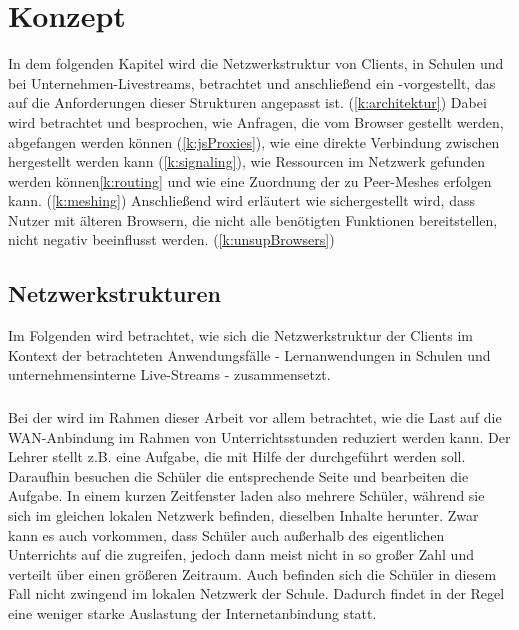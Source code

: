 \chapter{Konzept}\label{ch:concept}
%
In dem folgenden Kapitel wird die Netzwerkstruktur von Clients, in Schulen und bei Unternehmen-Livestreams, betrachtet und anschließend ein \pTp-\cdn vorgestellt, das auf die Anforderungen dieser Strukturen angepasst ist. (\ref{k:architektur}) Dabei wird betrachtet und besprochen, wie Anfragen, die vom Browser gestellt werden, abgefangen werden können (\ref{k:jsProxies}), wie eine direkte Verbindung zwischen \clients hergestellt werden kann (\ref{k:signaling}), wie Ressourcen im Netzwerk gefunden werden können\ref{k:routing} und wie eine Zuordnung der \clients zu Peer-Meshes erfolgen kann. (\ref{k:meshing}) Anschließend wird erläutert wie sichergestellt wird, dass Nutzer mit älteren Browsern, die nicht alle benötigten Funktionen bereitstellen, nicht negativ beeinflusst werden. (\ref{k:unsupBrowsers})


\section{Netzwerkstrukturen}
Im Folgenden wird betrachtet, wie sich die Netzwerkstruktur der Clients im Kontext der betrachteten Anwendungsfälle - Lernanwendungen in Schulen und unternehmensinterne Live-Streams - zusammensetzt.
\subsection{\schulCloud}
Bei der \schulCloud wird im Rahmen dieser Arbeit vor allem betrachtet, wie die Last auf die WAN-Anbindung im Rahmen von Unterrichtsstunden reduziert werden kann. Der Lehrer stellt z.B. eine Aufgabe, die mit Hilfe der \schulCloud durchgeführt werden soll. Daraufhin besuchen die Schüler die entsprechende Seite und bearbeiten die Aufgabe. In einem kurzen Zeitfenster laden also mehrere Schüler, während sie sich im gleichen lokalen Netzwerk befinden, dieselben Inhalte herunter. Zwar kann es auch vorkommen, dass Schüler auch außerhalb des eigentlichen Unterrichts auf die \schulCloud zugreifen, jedoch dann meist nicht in so großer Zahl und verteilt über einen größeren Zeitraum. Auch befinden sich die Schüler in diesem Fall nicht zwingend im lokalen Netzwerk der Schule. Dadurch findet in der Regel eine weniger starke Auslastung der Internetanbindung statt.


